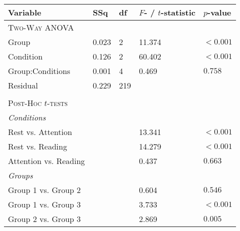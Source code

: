 \begin{tabular}{L{4cm}R{1.2cm}R{1.2cm}R{3cm}R{1.5cm}}
\toprule
Variable &    SSq &     df &          $F$- / $t$-statistic &        $p$-value \\
\midrule
\textsc{Two-Way ANOVA} 	& 	& & & \\
\hspace{3pt}Group                   &  0.023 &    2 &  11.374 &  $< 0.001$ \\
\hspace{3pt}Condition               &  0.126 &    2 &  60.402 &  $< 0.001$ \\
\hspace{3pt}Group:Conditions 		&  0.001 &    4 &   0.469 &  $0.758$ \\
\hspace{3pt}Residual                &  0.229 &  219 &         &            \\
& & & & \\
\textsc{Post-Hoc $t$-tests} & & & & \\
\textit{Conditions} & & & & \\
\hspace{3pt}Rest vs. Attention  	&    &     &  13.341 &  $< 0.001$ \\
\hspace{3pt}Rest vs. Reading  	&    &     &  14.279 &  $< 0.001$ \\
\hspace{3pt}Attention vs. Reading &    &    &  0.437 &  $0.663$ \\
\textit{Groups} & & & & \\
\hspace{3pt}Group 1 vs. Group 2  &    &     &  0.604 &  $0.546$ \\
\hspace{3pt}Group 1 vs. Group 3  &    &     &  3.733 &  $< 0.001$ \\
\hspace{3pt}Group 2 vs. Group 3  &    &     &  2.869 &  $0.005$ \\
\bottomrule
\end{tabular}

